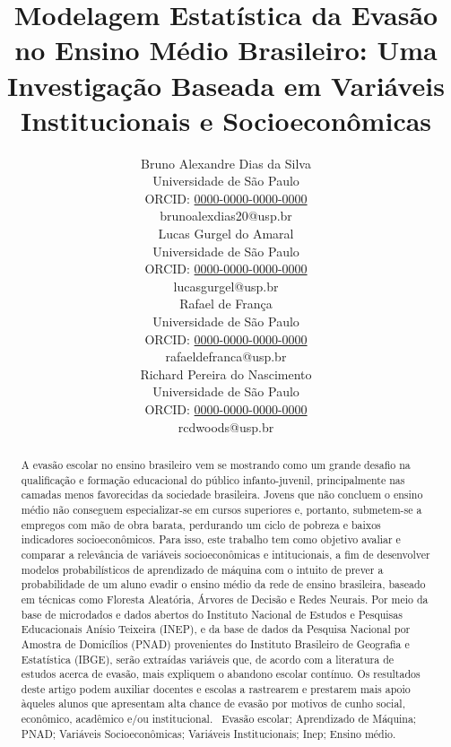 \documentclass[english, spanish, brazilian]{RBIEarticle} %
\title{Modelagem Estatística da Evasão no Ensino Médio Brasileiro: Uma Investigação Baseada em Variáveis Institucionais e Socioeconômicas}
\author{%
	\parbox{3.8cm}{%
		Bruno Alexandre Dias da Silva\\
		Universidade de São Paulo\\
		ORCID: \href{https://orcid.org/0000-0000-0000-0000}{0000-0000-0000-0000}\\
		brunoalexdias20@usp.br
	}
        \hspace{0.3cm}
	\parbox{3.8cm}{%
		Lucas Gurgel do Amaral\\
		Universidade de São Paulo\\
		ORCID: \href{https://orcid.org/0000-0000-0000-0000}{0000-0000-0000-0000}\\
		lucasgurgel@usp.br
	}
        \hspace{0.3cm}
        \parbox{3.8cm}{%
		Rafael de França\\
		Universidade de São Paulo\\
		ORCID: \href{https://orcid.org/0000-0000-0000-0000}{0000-0000-0000-0000}\\
		rafaeldefranca@usp.br
	}
        \hspace{0.3cm}
	\parbox{3.9cm}{\raggedright%
		Richard Pereira do Nascimento\\
		Universidade de São Paulo\\
		ORCID: \href{https://orcid.org/0000-0000-0000-0000}{0000-0000-0000-0000}\\
		rcdwoods@usp.br
	}
}
\begin{document}
\maketitle

\begin{otherlanguage}{brazilian}
\begin{abstract}
A evasão escolar no ensino brasileiro vem se mostrando como um grande desafio na qualificação e formação educacional do público infanto-juvenil, principalmente nas camadas menos favorecidas da sociedade brasileira. Jovens que não concluem o ensino médio não conseguem especializar-se em cursos superiores e, portanto, submetem-se a empregos com mão de obra barata, perdurando um ciclo de pobreza e baixos indicadores socioeconômicos. Para isso, este trabalho tem como objetivo avaliar e comparar a relevância de variáveis socioeconômicas e intitucionais, a fim de desenvolver modelos probabilísticos de aprendizado de máquina com o intuito de prever a probabilidade de um aluno evadir o ensino médio da rede de ensino brasileira, baseado em técnicas como Floresta Aleatória, Árvores de Decisão e Redes Neurais. Por meio da base de microdados e dados abertos do Instituto Nacional de Estudos e Pesquisas Educacionais Anísio Teixeira (INEP), e da base de dados da Pesquisa Nacional por Amostra de Domicílios (PNAD) provenientes do Instituto Brasileiro de Geografia e Estatística (IBGE), serão extraídas variáveis que, de acordo com a literatura de estudos acerca de evasão, mais expliquem o abandono escolar contínuo. Os resultados deste artigo podem auxiliar docentes e escolas a rastrearem e prestarem mais apoio àqueles alunos que apresentam alta chance de evasão por motivos de cunho social, econômico, acadêmico e/ou institucional.
\keywords\ Evasão escolar; Aprendizado de Máquina; PNAD; Variáveis Socioeconômicas; Variáveis Institucionais; Inep; Ensino médio.
\end{abstract}
\end{otherlanguage}
\end{document}

